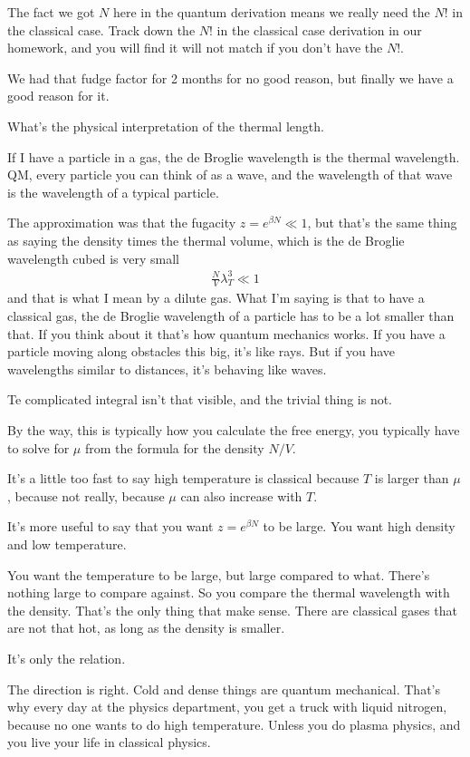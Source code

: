 The fact we got $N$ here in the quantum derivation means we really need the $N!$
in the classical case.
Track down the $N!$ in the classical case derivation in our homework,
and you will find it will not match if you don't have the $N!$.

We had that fudge factor for 2 months for no good reason,
but finally we have a good reason for it.
\begin{question}
What's the physical interpretation of the thermal length.
\end{question}
If I have a particle in a gas,
the de Broglie wavelength is the thermal wavelength.
QM,
every particle you can think of as a wave,
and the wavelength of that wave is the wavelength of a typical particle.

The approximation was that the fugacity $z=e^{\beta N}\ll 1$,
but that's the same thing as saying the density times the thermal volume,
which is the de Broglie wavelength cubed is very small
\begin{align}
    \frac{N}{V} \lambda_T^3 \ll 1
\end{align}
and that is what I mean by a dilute gas.
What I'm saying is that to have a classical gas,
the de Broglie wavelength of a particle has to be a lot smaller than that.
If you think about it that's how quantum mechanics works.
If you have a particle moving along obstacles this big,
it's like rays.
But if you have wavelengths similar to distances,
it's behaving like waves.

Te complicated integral isn't that visible,
and the trivial thing is not.

By the way,
this is typically how you calculate the free energy,
you typically have to solve for $\mu$ from the formula for the density $N/V$.

It's a little too fast to say high temperature is classical because $T$ is
larger than $\mu$,
because not really,
because $\mu$ can also increase with $T$.

It's more useful to say that you want $z=e^{\beta N}$ to be large.
You want high density and low temperature.

You want the temperature to be large,
but large compared to what.
There's nothing large to compare against.
So you compare the thermal wavelength with the density.
That's the only thing that make sense.
There are classical gases that are not that hot,
as long as the density is smaller.

It's only the relation.

The direction is right.
Cold and dense things are quantum mechanical.
That's why every day at the physics department,
you get a truck with liquid nitrogen,
because no one wants to do high temperature.
Unless you do plasma physics,
and you live your life in classical physics.
